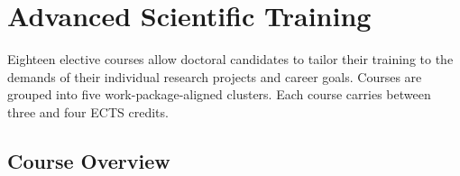 \chapter{Advanced Scientific Training}
\label{ch:elective-courses}

Eighteen elective courses allow doctoral candidates to tailor their training to
the demands of their individual research projects and career goals.  Courses are
grouped into five work-package-aligned clusters.  Each course carries between
three and four ECTS credits.

\section{Course Overview}
\label{sec:elective-overview}

